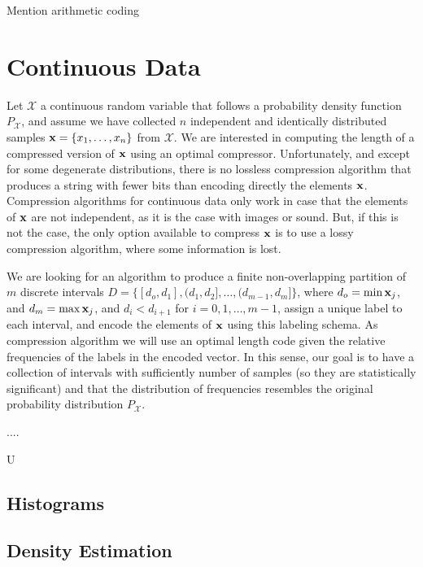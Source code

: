 {\color{red} Mention arithmetic coding}

%
%

\section{Continuous Data}

Let $\mathcal{X}$ a continuous random variable that follows a probability density function $P_\mathcal{X}$, and assume we have collected $n$ independent and identically distributed samples $\bold{x} = \{x_1, \ldots, x_n\}$ from $\mathcal{X}$. We are interested in computing the length of a compressed version of $\bold{x}$ using an optimal compressor. Unfortunately, and except for some degenerate distributions, there is no lossless compression algorithm that produces a string with fewer bits than encoding directly the elements $\bold{x}$. Compression algorithms for continuous data only work in case that the elements of $\bold{x}$ are not independent, as it is the case with images or sound. But, if this is not the case, the only option available to compress $\bold{x}$ is to use a lossy compression algorithm, where some information is lost.

We are looking for an algorithm to produce a finite non-overlapping partition of $m$ discrete intervals $D=\{ [d_o, d_1], (d_1, d_2], \ldots, (d_{m-1}, d_m] \}$, where $d_o = \min{\bold{x}_j}$, and $d_m = \max{\bold{x}_j}$, and $d_i < d_{i+1}$ for $i = 0, 1, \ldots, m-1$, assign a unique label to each interval, and encode the elements of $\bold{x}$ using this labeling schema. As compression algorithm we will use an optimal length code given the relative frequencies of the labels in the encoded vector. In this sense, our goal is to have a collection of intervals with sufficiently number of samples (so they are statistically significant) and that the distribution of frequencies resembles the original probability distribution $P_\mathcal{X}$.
 

....

U




\subsection{Histograms}

\subsection{Density Estimation}

